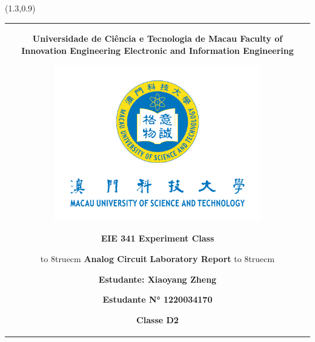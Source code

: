 \begin{titlepage}




\pagestyle{empty}


\begin{textblock}{0}(1.3,0.9)
\begin{center}
\begin{tabular}{c}
{\Huge \bf Universidade de Ciência e Tecnologia de Macau\\[10pt]
\hline\\[20pt]
{\bf \huge \sc Faculty of Innovation Engineering} \\[10pt]
{\huge Electronic and Information Engineering} \\[15pt]
\\
\\
\includegraphics[width=9cm]{Resources/must-logo.png}\\[15pt]
{\huge }

{\huge \textbf{EIE 341 Experiment Class}}\\[60pt]

{\hbox to 8truecm{\hrulefill}}\\[5pt]
{\huge  \textbf{Analog Circuit}}\\[10pt]
{\huge  \textbf{Laboratory Report}}\\
{\hbox to 8truecm{\hrulefill}}\\[50pt]

\begin{minipage}[t]{10cm}
    {\Large{\bf Estudante: \\Xiaoyang Zheng}}
\end{minipage}
\begin{minipage}[t]{5cm}\raggedleft
    {\Large{\bf Estudante N°\\ 1220034170}}\\

    {\Large{\bf Classe\\ D2}}
\end{minipage}

}
\end{tabular}
\end{center}
\end{textblock}
\end{titlepage}
